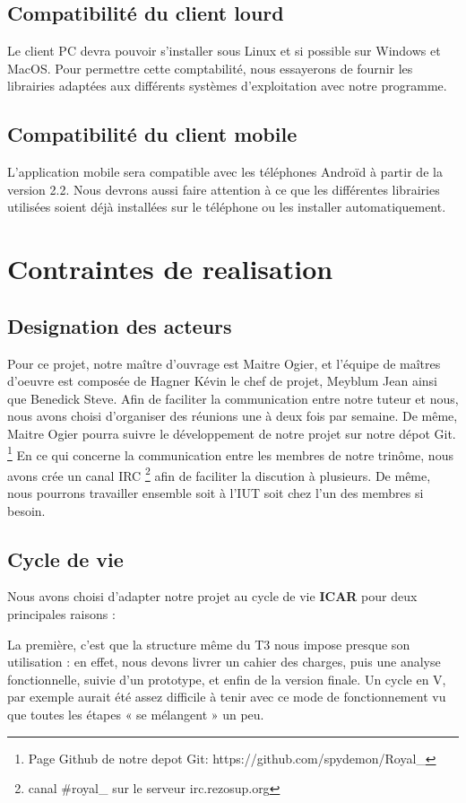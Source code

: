 \subsection{Compatibilité du client lourd}
Le client PC devra pouvoir s'installer sous Linux et si possible sur Windows et MacOS. 
Pour permettre cette comptabilité, nous essayerons de fournir les librairies adaptées aux différents systèmes d'exploitation avec notre programme. 

\subsection{Compatibilité du client mobile}
L'application mobile sera compatible avec les téléphones Androïd à partir de la version 2.2. 
Nous devrons aussi faire attention à ce que les différentes librairies utilisées soient déjà installées sur le téléphone ou les installer automatiquement.

\section{Contraintes de realisation}

\subsection{Designation des acteurs}
Pour ce projet, notre maître d'ouvrage est Maitre Ogier, et l'équipe de maîtres d'oeuvre est composée de Hagner Kévin le chef de projet, Meyblum Jean ainsi que Benedick Steve.
Afin de faciliter la communication entre notre tuteur et nous, nous avons choisi d'organiser des réunions une à deux fois par semaine. De même, Maitre Ogier pourra suivre le développement de notre projet sur notre dépot Git.
\footnote{Page Github de notre depot Git: https://github.com/spydemon/Royal\_} 
En ce qui concerne la communication entre les membres de notre trinôme, nous avons crée un canal IRC \footnote{ canal \#royal\_ sur le serveur irc.rezosup.org} afin de faciliter la discution à plusieurs. 
De même, nous pourrons travailler ensemble soit à l'IUT soit chez l'un des membres si besoin.

\subsection{Cycle de vie}
Nous avons choisi d'adapter notre projet au cycle de vie \textbf{ICAR} pour deux principales raisons : 

La première, c'est que la structure même du T3 nous impose presque son utilisation :
en effet, nous devons livrer un cahier des charges, puis une analyse fonctionnelle, suivie d'un prototype, et enfin de la version finale. 
Un cycle en V, par exemple aurait été assez difficile à tenir avec ce mode de fonctionnement vu que toutes les étapes « se mélangent » un peu. 

